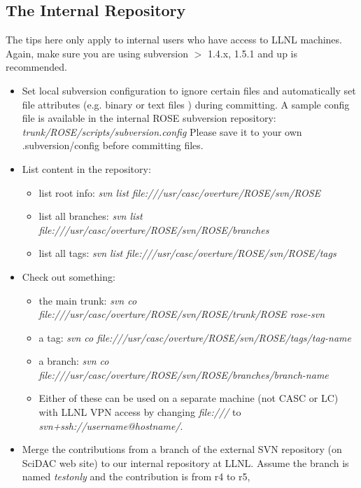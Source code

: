\subsection{The Internal Repository}
The tips here only apply to internal users who have access to LLNL
machines.
Again, make sure you are using subversion $>$ 1.4.x, 1.5.1 and up is recommended.
\begin{itemize}
\item Set local subversion configuration to ignore certain files and
automatically set file attributes (e.g. binary or text files ) during committing. 
A sample config file is available in the internal ROSE subversion repository:\\
  \textit{trunk/ROSE/scripts/subversion.config}
Please save it to your own .subversion/config before committing files. 
\item List content in the repository:
  \begin{itemize}
          \item list root info: \textit{svn list
          file:///usr/casc/overture/ROSE/svn/ROSE}
          \item list all branches: \textit{svn list
          file:///usr/casc/overture/ROSE/svn/ROSE/branches}
          \item list all tags: \textit{svn list
          file:///usr/casc/overture/ROSE/svn/ROSE/tags} 
   \end{itemize}       
\item Check out something:
   \begin{itemize}
          \item the main trunk: \textit{svn co
          file:///usr/casc/overture/ROSE/svn/ROSE/trunk/ROSE rose-svn} 
          \item a tag: \textit{svn co
          file:///usr/casc/overture/ROSE/svn/ROSE/tags/tag-name}
          \item a branch: \textit{svn co
          file:///usr/casc/overture/ROSE/svn/ROSE/branches/branch-name} 
          \item Either of these can be used on a separate machine (not CASC
          or LC) with LLNL VPN access by changing \textit{file:///} to
          \textit{svn+ssh://username@hostname/}. 
    \end{itemize}      
\item Merge the contributions from a branch of the external SVN repository (on SciDAC
web site) to our internal repository at LLNL. Assume the branch is named \textit{testonly} and the
contribution is from r4 to r5,

\end{itemize}
